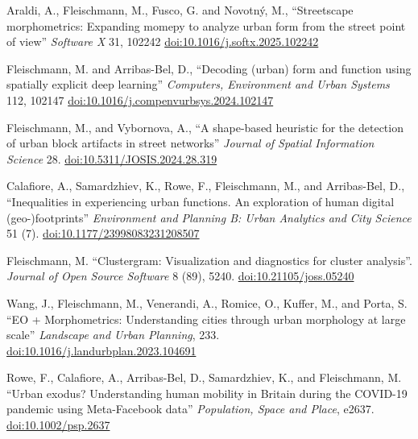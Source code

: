 \documentclass[12pt,a4paper]{report}
\begin{document}
\begin{tablist}
        \item[2025] \tab{}Araldi, A., Fleischmann, M., Fusco, G. and Novotný, M., \enquote{Streetscape morphometrics: Expanding momepy to analyze urban form from the street point of view} \textit{Software X} 31, 102242 \href{https://doi.org/10.1016/j.softx.2025.102242}{doi:10.1016/j.softx.2025.102242}

        \item[2024] \tab{}Fleischmann, M. and Arribas-Bel, D., \enquote{Decoding (urban) form and function using spatially explicit deep learning} \textit{Computers, Environment and Urban Systems} 112, 102147 \href{https://doi.org/10.1016/j.compenvurbsys.2024.102147}{doi:10.1016/j.compenvurbsys.2024.102147}

        \item[2024] \tab{}Fleischmann, M., and Vybornova, A., \enquote{A shape-based heuristic for the detection of urban block artifacts in street networks} \textit{Journal of Spatial Information Science} 28. \href{https://doi.org/10.5311/JOSIS.2024.28.319}{doi:10.5311/JOSIS.2024.28.319}

        \item[2023] \tab{}Calafiore, A., Samardzhiev, K., Rowe, F., Fleischmann, M., and Arribas-Bel, D., \enquote{Inequalities in experiencing urban functions. An exploration of human digital (geo-)footprints} \textit{Environment and Planning B: Urban Analytics and City Science} 51 (7). \href{https://doi.org/10.1177/23998083231208507}{doi:10.1177/23998083231208507}

        \item[2023] \tab{}Fleischmann, M. \enquote{Clustergram: Visualization and diagnostics for cluster analysis}. \textit{Journal of Open Source Software} 8 (89), 5240. \href{https://doi.org/10.21105/joss.05240}{doi:10.21105/joss.05240}

        \item[2023] \tab{}Wang, J., Fleischmann, M., Venerandi, A., Romice, O., Kuffer, M., and Porta, S. \enquote{EO + Morphometrics: Understanding cities through urban morphology at large scale} \textit{Landscape and Urban Planning}, 233. \href{https://doi.org/10.1016/j.landurbplan.2023.104691}{doi:10.1016/j.landurbplan.2023.104691}

        \item[2022] \tab{}Rowe, F., Calafiore, A., Arribas-Bel, D., Samardzhiev, K., and Fleischmann, M. \enquote{Urban exodus? Understanding human mobility in Britain during the COVID-19 pandemic using Meta-Facebook data} \textit{Population, Space and Place}, e2637. \href{https://doi.org/10.1002/psp.2637}{doi:10.1002/psp.2637}


\end{tablist}
\end{document}
